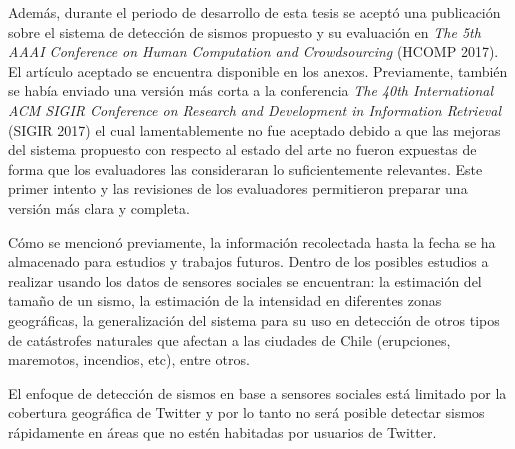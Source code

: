\begin{conclusion}
Además, durante el periodo de desarrollo de esta tesis se aceptó una publicación sobre el sistema de detección de sismos propuesto y su evaluación en \textit{The 5th AAAI Conference on Human Computation and Crowdsourcing} (HCOMP 2017). 
%
El artículo aceptado se encuentra disponible en los anexos. 
%
Previamente, también se había enviado una versión más corta a la conferencia \textit{The 40th International ACM SIGIR Conference on Research and Development in Information Retrieval} (SIGIR 2017) el cual lamentablemente no fue aceptado debido a que las mejoras del sistema propuesto con respecto al estado del arte no fueron expuestas de forma que los evaluadores las consideraran lo suficientemente relevantes. 
%
Este primer intento y las revisiones de los evaluadores permitieron preparar una versión más clara y completa.


Cómo se mencionó previamente, la información recolectada hasta la fecha se ha almacenado para estudios y trabajos futuros. Dentro de los posibles estudios a realizar usando los datos de sensores sociales se encuentran: la estimación del tamaño de un sismo, la estimación de la intensidad en diferentes zonas geográficas, la generalización del sistema para su uso en detección de otros tipos de catástrofes naturales que afectan a las ciudades de Chile (erupciones, maremotos, incendios, etc), entre otros.

El enfoque de detección de sismos en base a sensores sociales está limitado por la cobertura geográfica de Twitter y por lo tanto no será posible detectar sismos rápidamente en áreas que no estén habitadas por usuarios de Twitter.

\end{conclusion}

